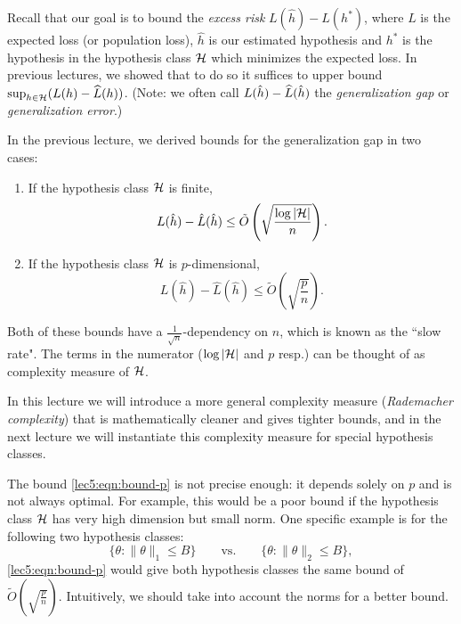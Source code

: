 \renewcommand{\l}{\left}
\renewcommand{\r}{\right}

\setcounter{section}{0}



Recall that our goal is to bound the \textit{excess risk} $L(\hat{h}) - L(h^*)$, where $L$ is the expected loss (or population loss), $\hat{h}$ is our estimated hypothesis and $h^*$ is the hypothesis in the hypothesis class $\mathcal H$ which minimizes the expected loss. In previous lectures, we showed that to do so it suffices to upper bound $\sup_{h\in \mathcal H} (L (h) - \widehat{L}(h))$. (Note: we often call $L(\hat{h}) - \widehat{L}(\hat{h})$ the \textit{generalization gap} or \textit{generalization error}.)

In the previous lecture, we derived bounds for the generalization gap in two cases:
\begin{enumerate}
	\item If the hypothesis class $\mathcal H$ is finite,
	\begin{equation}\label{lec5:eqn:bound-finite}
	L(\hat h) - \hat L(\hat h) \leq \tilde O \l( \sqrt{\frac{\log |\cH|}{n}} \r).
	\end{equation}
	\item If the hypothesis class $\mathcal H$ is $p$-dimensional,
	\begin{equation}\label{lec5:eqn:bound-p}
	L(\hat h) - \hat L(\hat h) \leq \tilde O \l( \sqrt{\frac{p}{n}} \r).
	\end{equation}
\end{enumerate} 
Both of these bounds have a $\frac{1}{\sqrt{n}}$-dependency on $n$, which is known as the ``slow rate". The terms in the numerator ($\log |\mathcal H|$ and $p$ resp.) can be thought of as complexity measure of $\mathcal H$.

In this lecture we will introduce a more general complexity measure (\textit{Rademacher complexity}) that is mathematically cleaner and gives tighter bounds, and in the next lecture we will instantiate this complexity measure for special hypothesis classes.


The bound \eqref{lec5:eqn:bound-p} is not precise enough: it depends solely on $p$ and is not always optimal. For example, this would be a poor bound if the hypothesis class $\mathcal H$ has very high dimension but small norm. One specific example is for the following two hypothesis classes:
$$ \{\theta : \|\theta\|_1 \leq B\} \qquad \text{vs.} \qquad \{\theta : \|\theta\|_2 \leq B\},$$
\eqref{lec5:eqn:bound-p} would give both hypothesis classes the same bound of $\tilde O \l( \sqrt{\frac{p}{n}} \r)$. Intuitively, we should take into account the norms for a better bound.

